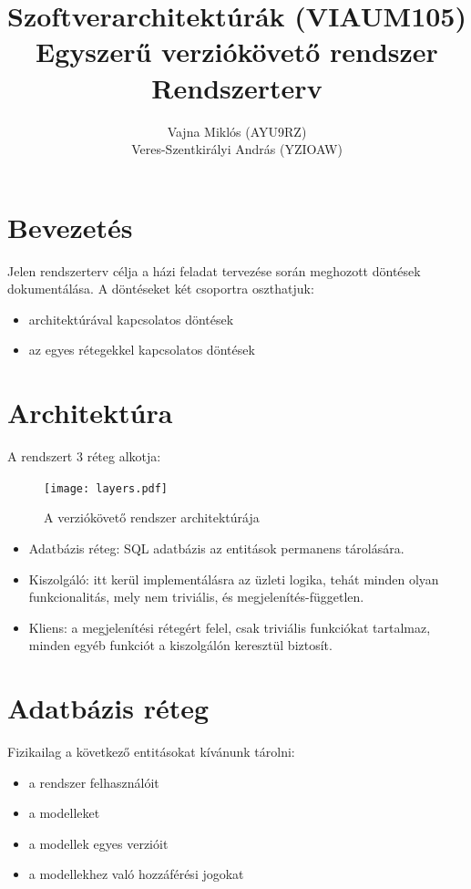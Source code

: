\documentclass[a4paper,12pt]{article}
\title{Szoftverarchitektúrák (VIAUM105)\\Egyszerű verziókövető rendszer\\Rendszerterv}
\author{Vajna Miklós (AYU9RZ)\\Veres-Szentkirályi András (YZIOAW)}
\begin{document}
\maketitle
\thispagestyle{empty}
\lstset{numbers=left, numberstyle=\tiny, basicstyle=\ttfamily, breaklines=true, frame=single, tabsize=2}

\pagebreak
\onehalfspacing
\section{Bevezetés}

Jelen rendszerterv célja a házi feladat tervezése során meghozott döntések
dokumentálása. A döntéseket két csoportra oszthatjuk:

\begin{itemize}
\item architektúrával kapcsolatos döntések
\item az egyes rétegekkel kapcsolatos döntések
\end{itemize}

\section{Architektúra}

A rendszert 3 réteg alkotja:

\begin{figure}[H]
\centering
\texttt{[image: layers.pdf]}
\caption{A verziókövető rendszer architektúrája}
\end{figure}

\begin{itemize}
\item Adatbázis réteg: SQL adatbázis az entitások permanens tárolására.
\item Kiszolgáló: itt kerül implementálásra az üzleti logika, tehát minden
olyan funkcionalitás, mely nem triviális, és megjelenítés-független.
\item Kliens: a megjelenítési rétegért felel, csak triviális funkciókat
tartalmaz, minden egyéb funkciót a kiszolgálón keresztül biztosít.
\end{itemize}

\clearpage
\section{Adatbázis réteg}

Fizikailag a következő entitásokat kívánunk tárolni:

\begin{itemize}
\item a rendszer felhasználóit
\item a modelleket
\item a modellek egyes verzióit
\item a modellekhez való hozzáférési jogokat
\end{itemize}
\end{document}
